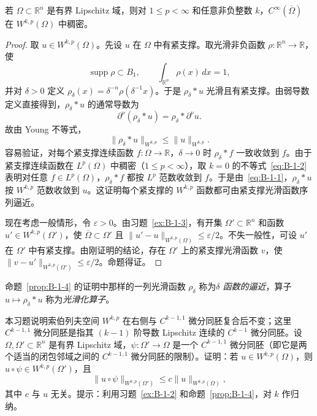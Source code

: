 \begin{proposition}\label{prop:B-1-4}
若 $\Omega\subset\mathbb R^n$ 是有界 Lipschitz 域，则对 $1\le p<\infty$ 和任意非负整数 $k$，$C^\infty(\overline\Omega)$ 在 $W^{k,p}(\Omega)$ 中稠密。
\end{proposition}
\begin{proof}
取 $u\in W^{k,p}(\Omega)$。先设 $u$ 在 $\Omega$ 中有紧支撑。取光滑非负函数 $\rho:\mathbb R^n\to\mathbb R$，使
\[
  \operatorname{supp}\rho\subset B_1,\qquad\int_{\mathbb R^n}\rho(x)\,dx=1,
\]
并对 $\delta>0$ 定义 $\rho_\delta(x)=\delta^{-n}\rho(\delta^{-1}x)$。于是 $\rho_\delta*u$ 光滑且有紧支撑。由弱导数定义直接得到，$\rho_\delta*u$ 的通常导数为
\begin{equation}\label{eq:B-1-1}
  \partial^\nu(\rho_\delta*u)=\rho_\delta*\partial^\nu u.
\end{equation}
故由 Young 不等式，
\begin{equation}\label{eq:B-1-2}
  \|\rho_\delta*u\|_{W^{k,p}}\le\|u\|_{W^{k,p}}.
\end{equation}
容易验证，对每个紧支撑连续函数 $f:\Omega\to\mathbb R$，$\delta\to0$ 时 $\rho_\delta*f$ 一致收敛到 $f$。由于紧支撑连续函数在 $L^p(\Omega)$ 中稠密（$1\le p<\infty$），取 $k=0$ 的不等式~\eqref{eq:B-1-2} 表明对任意 $f\in L^p(\Omega)$，$\rho_\delta*f$ 都按 $L^p$ 范数收敛到 $f$。于是由~\eqref{eq:B-1-1}，$\rho_\delta*u$ 按 $W^{k,p}$ 范数收敛到 $u$。这证明每个紧支撑的 $W^{k,p}$ 函数都可由紧支撑光滑函数序列逼近。

现在考虑一般情形，令 $\varepsilon>0$。由习题~\ref{ex:B-1-3}，有开集 $\Omega'\subset\mathbb R^n$ 和函数 $u'\in W^{k,p}(\Omega')$，使 $\overline\Omega\subset\Omega'$ 且 $\|u'-u\|_{W^{k,p}(\Omega)}\le\varepsilon/2$。不失一般性，可设 $u'$ 在 $\Omega'$ 中有紧支撑。由刚证明的结论，存在 $\Omega'$ 上的紧支撑光滑函数 $v$，使 $\|v-u'\|_{W^{k,p}(\Omega')}\le\varepsilon/2$。命题得证。
\end{proof}

命题~\ref{prop:B-1-4} 的证明中那样的一列光滑函数 $\rho_\delta$ 称为\emph{$\delta$ 函数的逼近}，算子 $u\mapsto\rho_\delta*u$ 称为\emph{光滑化算子}。

\begin{exercise}\label{ex:B-1-5}
本习题说明索伯列夫空间 $W^{k,p}$ 在右侧与 $C^{k-1,1}$ 微分同胚复合后不变；这里 $C^{k-1,1}$ 微分同胚是指其 $(k-1)$ 阶导数 Lipschitz 连续的 $C^{k-1}$ 微分同胚。设 $\Omega,\Omega'\subset\mathbb R^n$ 是有界 Lipschitz 域，$\psi:\Omega'\to\Omega$ 是一个 $C^{k-1,1}$ 微分同胚（即它是两个适当的闭包邻域之间的 $C^{k-1,1}$ 微分同胚的限制）。证明：若 $u\in W^{k,p}(\Omega)$，则 $u\circ\psi\in W^{k,p}(\Omega')$，且
\[
  \|u\circ\psi\|_{W^{k,p}(\Omega')}\le c\|u\|_{W^{k,p}(\Omega)},
\]
其中 $c$ 与 $u$ 无关。提示：利用习题~\ref{ex:B-1-2} 和命题~\ref{prop:B-1-4}，对 $k$ 作归纳。
\end{exercise}

